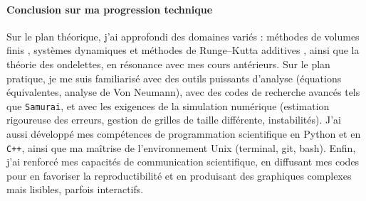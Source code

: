 \paragraph*{Conclusion sur ma progression technique}\label{par:cc2}
Sur le plan théorique, j'ai approfondi des domaines variés : méthodes de volumes finis \cite{LeVeque1990}, systèmes dynamiques et méthodes de Runge–Kutta additives \cite{HairerAndWanner1}, ainsi que la théorie des ondelettes, en résonance avec mes cours antérieurs.
Sur le plan pratique, je me suis familiarisé avec des outils puissants d'analyse (équations équivalentes, analyse de Von Neumann), avec des codes de recherche avancés tels que \texttt{Samurai}, et avec les exigences de la simulation numérique (estimation rigoureuse des erreurs, gestion de grilles de taille différente, instabilités).
J'ai aussi développé mes compétences de programmation scientifique en Python et en \texttt{C++}, ainsi que ma maîtrise de l'environnement Unix (terminal, git, bash).
Enfin, j'ai renforcé mes capacités de communication scientifique, en diffusant mes codes pour en favoriser la reproductibilité et en produisant des graphiques complexes mais lisibles, parfois interactifs.
